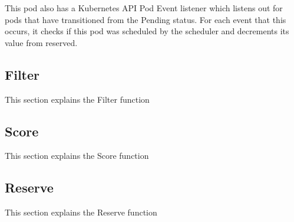 This pod also has a Kubernetes API Pod Event listener which listens out for pods
that have transitioned from the Pending status. For each event that this occurs,
it checks if this pod was scheduled by the scheduler and decrements its value
from reserved.


\subsection{Filter}
This section explains the Filter function

\subsection{Score}
This section explains the Score function

\subsection{Reserve}
This section explains the Reserve function
